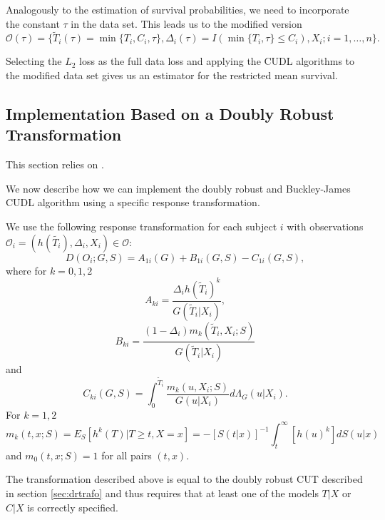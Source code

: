 \documentclass[12pt, a4paper]{scrartcl}
\theoremstyle{definition}
\theoremstyle{plain}
\numberwithin{equation}{section}
\numberwithin{figure}{section}
\numberwithin{table}{section}
\begin{document}
	Analogously to the estimation of survival probabilities, we need to incorporate the constant $\tau$ in the data set.
	This leads us to the modified version	
	\begin{equation*}
		\mathcal{O}(\tau) = \{\tilde{T}_i(\tau) = \min\{T_i, C_i, \tau\}, \Delta_i(\tau) = I(\min\{T_i, \tau\}\leq C_i), X_i; i = 1, \dots , n\}.
	\end{equation*}
	
	Selecting the $L_2$ loss as the full data loss and applying the CUDL algorithms to the modified data set gives us an estimator for the restricted mean survival.
	
	\subsection{Implementation Based on a Doubly Robust Transformation}\label{trafo}
	
	This section relies on \citet*{basearticle}.
	
	We now describe how we can implement the doubly robust and Buckley-James CUDL algorithm using a specific response transformation.
	
	We use the following response transformation for each subject $i$ with observations $\mathcal{O}_i = (h(\tilde{T_i}), \Delta_i, X_i) \in \mathcal{O}$:
	\begin{equation*}
	D(O_i; G,S) = A_{1i}(G)+B_{1i}(G,S) - C_{1i}(G,S),
	\end{equation*}
	where for $k=0,1,2$
	\begin{equation*}
	A_{ki} = \frac{\Delta_i h(\tilde{T}_i)^k}{G(\tilde{T}_i\vert X_i)},
	\end{equation*}
	\begin{equation*}
	B_{ki} = \frac{(1-\Delta_i)m_k(\tilde{T}_i, X_i; S)}{G(\tilde{T}_i\vert X_i)}
	\end{equation*}
	and
	\begin{equation*}
	C_{ki} (G,S) = \int_{0}^{\tilde{T}_i} \frac{m_k(u, X_i; S)}{G(u \vert X_i)}d\Lambda_G(u \vert X_i).
	\end{equation*}
	For $k=1,2$
	\begin{equation}\label{eq:condexp}
	m_k(t,x;S) = E_S[h^k(T) \vert T \geq t, X = x] = -[S(t\vert x)]^{-1} \int_{t}^{\infty}[h(u)^k]dS(u\vert x)
	\end{equation}
	and $m_0(t,x;S) = 1$ for all pairs $(t,x)$.
	
	The transformation described above is equal to the doubly robust CUT described in section \ref{sec:drtrafo} and thus requires that at least one of the models $T\vert X$ or $C \vert X$ is correctly specified.
	
\end{document}
